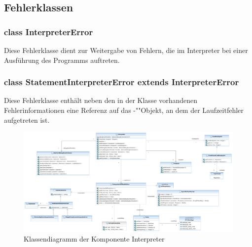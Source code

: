 \subsection{Fehlerklassen}
\subsubsection{class InterpreterError}
Diese Fehlerklasse dient zur Weitergabe von Fehlern, die im Interpreter bei einer Ausführung des Programms auftreten.

\subsubsection{class StatementInterpreterError extends InterpreterError}
Diese Fehlerklasse enthält neben den in der Klasse  vorhandenen Fehlerinformationen eine Referenz auf das -""Objekt, an dem der Laufzeitfehler aufgetreten ist.

\begin{landscape}%
    \begin{figure}%
        \vspace{-15mm}
        \includegraphics[width=250mm]{diagrams/interpreter_component.pdf}

        \caption{Klassendiagramm der Komponente Interpreter}

    \end{figure}%
\end{landscape}%

